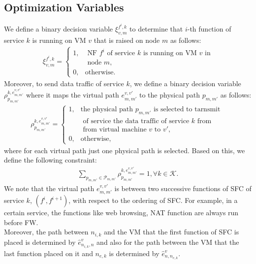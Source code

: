 \documentclass[20pt,twocolumn]{IEEEtran}
\begin{document}
\subsection{Optimization Variables}
We define a binary decision variable $\xi_{v,m}^{f^{i},k}$ to determine that $i$-th function of service $k$ is running on VM $v$ that is raised on node $m$ as follows:
\begin{align}
\xi_{v,m}^{f^{i},k}=\begin{cases}
1,& \text{  NF $f^{i}$ of service $k$ is running on VM $v$ in} \\&\text{  node $m$,} \\0,& \text{otherwise}.
\end{cases} 
\end{align} 
Moreover, to send data traffic of service $k$, we define a binary decision variable $\rho^{k,e^{v,v'}_{m,m'}}_{p_{m,m'}}$ where it maps the virtual path $e^{v,v'}_{m,m'}$ to the physical path $p_{m,m'}$ as follows:
\begin{align}
\rho^{k,e^{v,v'}_{m,m'}}_{p_{m,m'}}=
\begin{cases}
1,& \text{the physical path $p_{m,m'}$ is selected to tarnsmit  }\\& \text{ of service the data traffic of service $k$ from} \\&\text{ from virtual machine $v$ to $v'$},\\
0,& \text{otherwise},
\end{cases}
\end{align}
where for each virtual path just one physical path is selected. Based on this,  we define the following constraint:
\begin{align}
\label{sum1}
\sum_{p_{m,m'}\in \mathcal{P}_{m,m'}}\rho^{k,e^{v,v'}_{m,m'}}_{p_{m,m'}}=1, \forall k \in \mathcal{K}.
\end{align}
We note that the virtual path $e^{v,v'}_{m,m'}$ is between two successive functions of SFC of service $k$, $(f^{i},f^{i+1})$, with respect to the ordering of SFC. For example, in a certain service, the functions like web browsing, NAT function are always run before FW.\\
Moreover, the path between  $n_{i,k}$ and the VM that the first function  of SFC is placed is determined by $\hat{e}^{v}_{n_{i,k},n}$ and also for the path between the VM that  the last function placed on it and $n_{e,k}$ is determined by $\hat{e}^{v}_{n,n_{e,k}}$.
\end{document}
